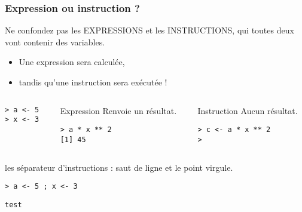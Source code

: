 \documentclass[10pt]{beamer}
\begin{document}

\begin{frame}[fragile]
  \frametitle{Expression ou instruction ?}
  Ne confondez pas les EXPRESSIONS et les INSTRUCTIONS, qui toutes deux vont contenir des variables.
  \begin{itemize}
  \item Une expression sera \alert{calculée},
  \item tandis qu'une instruction sera \alert{exécutée} !
  \end{itemize}


  
\begin{columns}[b]
\begin{column}{0.33\textwidth}
    \begin{lstlisting}
> a <- 5
> x <- 3
\end{lstlisting}
    
\end{column}
    
\begin{column}{0.33\textwidth}
  \begin{alertblock}{Expression}
    Renvoie un résultat.
    \begin{lstlisting}
> a * x ** 2
[1] 45      
    \end{lstlisting}
    
  \end{alertblock}
\end{column}
\begin{column}{0.33\textwidth}
  \begin{alertblock}{Instruction}
    Aucun résultat.
    \begin{lstlisting}
> c <- a * x ** 2
>
    \end{lstlisting}
  \end{alertblock}
\end{column}
\end{columns}

\begin{block}{les séparateur d'instructions : saut de ligne et le point virgule.}
  \begin{lstlisting}[style=block]
> a <- 5 ; x <- 3
\end{lstlisting}
  
\end{block}
\begin{lstlisting}[style=editor]
  test
  
\end{lstlisting}
\end{frame}
\end{document}
